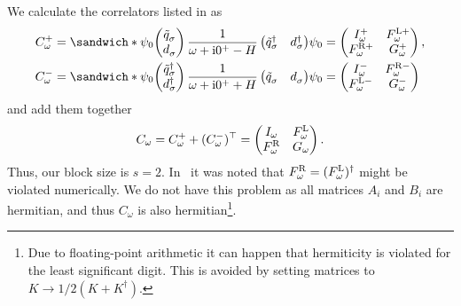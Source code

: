 We calculate the correlators listed in  as
\begin{subequations}
    \begin{align}
        C^+_\omega
         & =
        \sandwich*
        {\psi_0}
        {
            \begin{pmatrix}
                \tilde q^{\pdag}_\sigma \\
                d^{\pdag}_\sigma
            \end{pmatrix}
            \frac{1}{\omega + \mi0^+ - H}
            \begin{pmatrix}
                \tilde q^\dag_\sigma & d^\dag_\sigma
            \end{pmatrix}
        }
        {\psi_0}
        =
        \begin{pmatrix}
            I^+_\omega      & F^{\mL+}_\omega \\
            F^{\mR+}_\omega & G^+_\omega
        \end{pmatrix}, \\
        C^-_\omega
         & =
        \sandwich*
        {\psi_0}
        {
            \begin{pmatrix}
                \tilde q^\dag_\sigma \\
                d^\dag_\sigma
            \end{pmatrix}
            \frac{1}{\omega + \mi0^+ + H}
            \begin{pmatrix}
                \tilde q^{\pdag}_\sigma & d^{\pdag}_\sigma
            \end{pmatrix}
        }
        {\psi_0}
        =
        \begin{pmatrix}
            I^-_\omega      & F^{\mR-}_\omega \\
            F^{\mL-}_\omega & G^-_\omega
        \end{pmatrix}
    \end{align}%
\end{subequations}
and add them together
\begin{equation}
    C_\omega
    =
    C^+_\omega + (C^-_\omega)^\top
    =
    \begin{pmatrix}
        I_\omega       & F^{\mathrm{L}}_\omega \\
        F^{\mathrm{R}}_\omega & G_\omega
    \end{pmatrix}.
\end{equation}
Thus, our block size is $s=2$.
In~\cite{Kugler2022} it was noted that $F^{\mathrm{R}}_\omega = (F^{\mathrm{L}}_\omega)^\dag$
might be violated numerically.
We do not have this problem as all matrices $A_i$ and $B_i$ are hermitian,
and thus $C_\omega$ is also hermitian\footnote{
    Due to floating-point arithmetic it can happen that hermiticity is violated for the least
    significant digit. This is avoided by setting matrices to $K \to 1/2 (K + K^\dag)$.
}.

